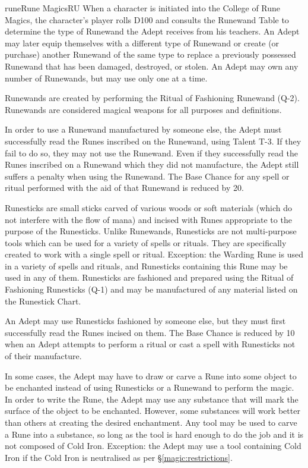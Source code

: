 \begin{college}[1.1]{rune}{Rune Magics}{RU}
When a character is initiated into the College of Rune Magics, the
character's player rolls D100 and consults the Runewand Table to
determine the type of Runewand the Adept receives from his
teachers. An Adept may later equip themselves with a different type of
Runewand or create (or purchase) another Runewand of the same type to
replace a previously possessed Runewand that has been damaged,
destroyed, or stolen.  An Adept may own any number of Runewands, but
may use only one at a time.

Runewands are created by performing the Ritual of Fashioning Runewand
(Q-2). Runewands are considered magical weapons for all purposes and
definitions.

In order to use a Runewand manufactured by someone else, the Adept
must successfully read the Runes inscribed on the Runewand, using
Talent T-3.  If they fail to do so, they may not use the
Runewand. Even if they successfully read the Runes inscribed on a
Runewand which they did not manufacture, the Adept still suffers a
penalty when using the Runewand. The Base Chance for any spell or
ritual performed with the aid of that Runewand is reduced by 20.

Runesticks are small sticks carved of various woods or soft materials
(which do not interfere with the flow of mana) and incised with Runes
appropriate to the purpose of the Runesticks.  Unlike Runewands,
Runesticks are not multi-purpose tools which can be used for a variety
of spells or rituals.  They are specifically created to work with a
single spell or ritual.  Exception: the Warding Rune is used in a
variety of spells and rituals, and Runesticks containing this Rune may
be used in any of them.  Runesticks are fashioned and prepared using
the Ritual of Fashioning Runesticks (Q-1) and may be manufactured of
any material listed on the Runestick Chart.

An Adept may use Runesticks fashioned by someone else, but they must
first successfully read the Runes incised on them.  The Base Chance is
reduced by 10 when an Adept attempts to perform a ritual or cast a
spell with Runesticks not of their manufacture.

In some cases, the Adept may have to draw or carve a Rune into some
object to be enchanted instead of using Runesticks or a Runewand to
perform the magic.  In order to write the Rune, the Adept may use any
substance that will mark the surface of the object to be enchanted.
However, some substances will work better than others at creating the
desired enchantment.  Any tool may be used to carve a Rune into a
substance, so long as the tool is hard enough to do the job and it is
not composed of Cold Iron. Exception: the Adept may use a tool
containing Cold Iron if the Cold Iron is neutralised as per
\S\ref{magic:restrictions}.


\end{college}
